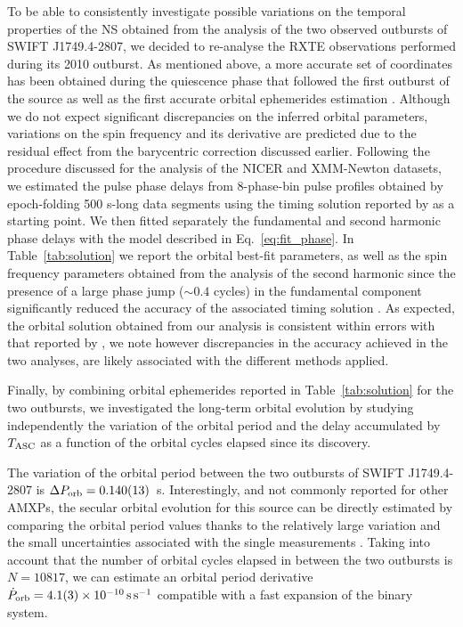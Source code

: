 \documentclass[fleqn,usenatbib]{mnras}
\newcommand{\swiftj}{SWIFT J1749.4-2807}
\newcommand{\nicer}{NICER}
\newcommand{\xmm}{XMM-Newton}
\newcommand{\rxte}{RXTE}
\begin{document}
To be able to consistently investigate possible variations on the temporal properties of the NS obtained from the analysis of the two observed outbursts of \swiftj{}, we decided to re-analyse the \rxte{} observations performed during its 2010 outburst. As mentioned above, a more accurate set of coordinates has been obtained during the quiescence phase that followed the first outburst of the source \citep{Jonker:2013wp} as well as the first accurate orbital ephemerides estimation \citep{Markwardt:2010tl}. Although we do not expect significant discrepancies on the inferred orbital parameters, variations on the spin frequency and its derivative are predicted due to the residual effect from the barycentric correction discussed earlier. Following the procedure discussed for the analysis of the \nicer{} and \xmm{} datasets, we estimated the pulse phase delays from 8-phase-bin pulse profiles obtained by epoch-folding 500 s-long data segments using the timing solution reported by \citet{Markwardt:2010tl} as a starting point. We then fitted separately the fundamental and second harmonic phase delays with the model described in Eq.~\ref{eq:fit_phase}. In Table~\ref{tab:solution} we report the orbital best-fit parameters, as well as the spin frequency parameters obtained from the analysis of the second harmonic since the presence of a large phase jump ($\sim0.4$ cycles) in the fundamental component significantly reduced the accuracy of the associated timing solution \citep[a similar conclusion has been reached by][]{Markwardt:2010tl,Altamirano:2011uq}. As expected, the orbital solution obtained from our analysis is consistent within errors with that reported by \citet{Markwardt:2010tl}, we note however discrepancies in the accuracy achieved in the two analyses, are likely associated with the different methods applied.  


Finally, by combining orbital ephemerides reported in Table~\ref{tab:solution} for the two outbursts, we investigated the long-term orbital evolution by studying independently the variation of the orbital period and the delay accumulated by $T_{\rm ASC}$ as a function of the orbital cycles elapsed since its discovery. 

The variation of the orbital period between the two outbursts of \swiftj{} is $\Delta P_{\rm orb}=0.140(13)$~s. Interestingly, and not commonly reported for other AMXPs, the secular orbital evolution for this source can be directly estimated by comparing the orbital period values thanks to the relatively large variation and the small uncertainties associated with the single measurements \citep[something similar has been observed for the AMXP IGR J17511-3057;][in prep.]{Riggio2022}. Taking into account that the number of orbital cycles elapsed in between the two outbursts is $N=10817$, we can estimate an orbital period derivative $\dot{P}_{\rm orb}=4.1(3)\times 10^{-10}\,\text{s}\,\text{s}^{-1}$ compatible with a fast expansion of the binary system.
\end{document}
